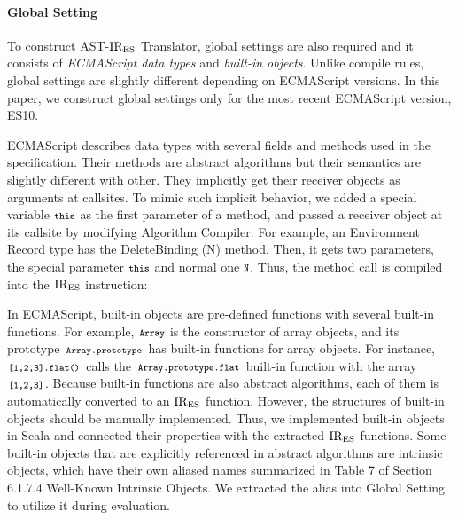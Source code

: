 \paragraph{Global Setting}
To construct {\sf AST-\( \text{IR}_\text{ES} \) Translator}, global settings are also required
and it consists of \textit{ECMAScript data types} and \textit{built-in objects}.
Unlike compile rules, global settings are slightly different depending on
ECMAScript versions. In this paper, we construct global settings only for the
most recent ECMAScript version, ES10.

ECMAScript describes data types with several fields and methods used in the
specification.  Their methods are abstract algorithms but their semantics are
slightly different with other. They implicitly get their receiver objects as
arguments at callsites.  To mimic such implicit behavior, we added a special
variable \( \texttt{\footnotesize this} \) as the first parameter of a method, and passed a
receiver object at its callsite by modifying \textsf{Algorithm Compiler}.  For
example, an Environment Record type has the \textsf{DeleteBinding (N)} method.
Then, it gets two parameters, the special parameter \( \texttt{\footnotesize this} \) and normal
one \( \texttt{\footnotesize N} \).  Thus, the method call
is compiled into the \( \text{IR}_\text{ES} \) instruction: 

In ECMAScript, built-in objects are pre-defined functions with several
built-in functions.  For example, \( \texttt{\footnotesize Array} \)
is the constructor of array objects, and its prototype
\( \texttt{\footnotesize Array.prototype} \) has built-in functions for array objects.
For instance, \( \texttt{\footnotesize[1,2,3].flat()} \) calls the
\( \texttt{\footnotesize Array.prototype.flat} \) built-in function with the array
\( \texttt{\footnotesize[1,2,3]} \).  Because built-in functions are also abstract
algorithms, each of them is automatically converted to an \( \text{IR}_\text{ES} \)
function.  However, the structures of built-in objects should be
manually implemented.  Thus, we implemented built-in objects in Scala
and connected their properties with the extracted \( \text{IR}_\text{ES} \) functions.
%
Some built-in objects that are explicitly referenced in abstract
algorithms are intrinsic objects, which have their own
aliased names summarized in Table 7 of Section 6.1.7.4
\textsf{Well-Known Intrinsic Objects}.  We extracted the alias
into \textsf{Global Setting} to utilize it during evaluation.
